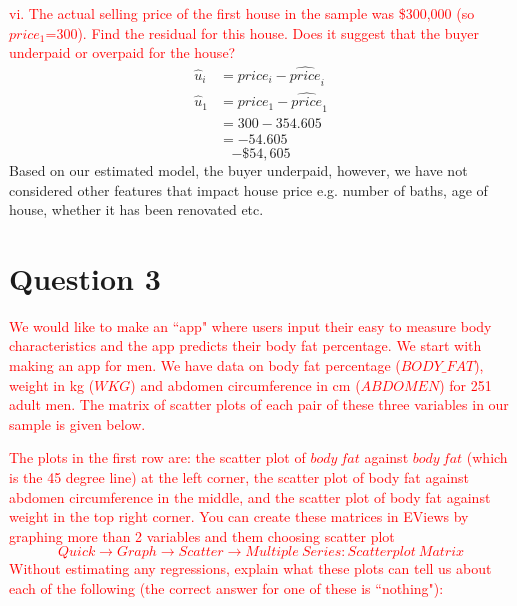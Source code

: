 \documentclass[12pt]{report}
\begin{document}
\noindent \textcolor{red}
{
	vi. The actual selling price of the first house in the sample was \$300,000 (so $price_1$=300). Find the residual for this house. Does it suggest that the buyer underpaid or overpaid for the house?
}
\begin{align*}
\hat{u}_i &= price_i - \widehat{price}_i \\
\hat{u}_1 &= price_1 - \widehat{price}_1 \\
&= 300 - 354.605 \\
&= -54.605
\end{align*}
$$-\$54,605$$
\noindent Based on our estimated model, the buyer underpaid, however, we have not considered other features that impact house price e.g. number of baths, age of house, whether it has been renovated etc.

\newpage
\section*{Question 3}
\noindent \textcolor{red}{We would like to make an ``app" where users input their easy to measure body characteristics and the app predicts their body fat percentage. We start with making an app for men. We have data on body fat percentage ($BODY\_FAT$), weight in kg ($WKG$) and abdomen circumference in cm ($ABDOMEN$) for 251 adult men. The matrix of scatter plots of each pair of these three variables in our sample is given below.}
\begin{figure}[H]
	\centering
\end{figure}
\noindent \textcolor{red}{The plots in the first row are: the scatter plot of $body\ fat$ against $body\ fat$ (which is the 45 degree line) at the left corner, the scatter plot of body fat against abdomen circumference in the middle, and the scatter plot of body fat against weight in the top right corner. You can create these matrices in EViews by graphing more than 2 variables and them choosing scatter plot $$Quick \to Graph \to Scatter \to Multiple\ Series: Scatterplot\ Matrix$$ Without estimating any regressions, explain what these plots can tell us about each of the following (the correct answer for one of these is ``nothing"):}
\end{document}
